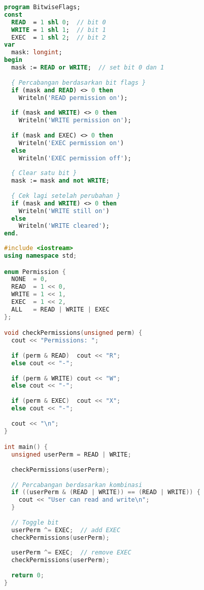 \documentclass[../main.tex]{subfiles}
\begin{document}
\begin{lstlisting}[language=Pascal, caption={Pergeseran dan bitwise dengan kondisi di Pascal}]
program BitwiseFlags;
const
  READ  = 1 shl 0;  // bit 0
  WRITE = 1 shl 1;  // bit 1
  EXEC  = 1 shl 2;  // bit 2
var
  mask: longint;
begin
  mask := READ or WRITE;  // set bit 0 dan 1
  
  { Percabangan berdasarkan bit flags }
  if (mask and READ) <> 0 then
    Writeln('READ permission on');
  
  if (mask and WRITE) <> 0 then
    Writeln('WRITE permission on');
  
  if (mask and EXEC) <> 0 then
    Writeln('EXEC permission on')
  else
    Writeln('EXEC permission off');
  
  { Clear satu bit }
  mask := mask and not WRITE;
  
  { Cek lagi setelah perubahan }
  if (mask and WRITE) <> 0 then
    Writeln('WRITE still on')
  else
    Writeln('WRITE cleared');
end.
\end{lstlisting}

\begin{lstlisting}[language=C++, caption={Bitwise flags dengan switch di C++}]
#include <iostream>
using namespace std;

enum Permission {
  NONE  = 0,
  READ  = 1 << 0,
  WRITE = 1 << 1,
  EXEC  = 1 << 2,
  ALL   = READ | WRITE | EXEC
};

void checkPermissions(unsigned perm) {
  cout << "Permissions: ";
  
  if (perm & READ)  cout << "R";
  else cout << "-";
  
  if (perm & WRITE) cout << "W";
  else cout << "-";
  
  if (perm & EXEC)  cout << "X";
  else cout << "-";
  
  cout << "\n";
}

int main() {
  unsigned userPerm = READ | WRITE;
  
  checkPermissions(userPerm);
  
  // Percabangan berdasarkan kombinasi
  if ((userPerm & (READ | WRITE)) == (READ | WRITE)) {
    cout << "User can read and write\n";
  }
  
  // Toggle bit
  userPerm ^= EXEC;  // add EXEC
  checkPermissions(userPerm);
  
  userPerm ^= EXEC;  // remove EXEC
  checkPermissions(userPerm);
  
  return 0;
}
\end{lstlisting}
\end{document}
